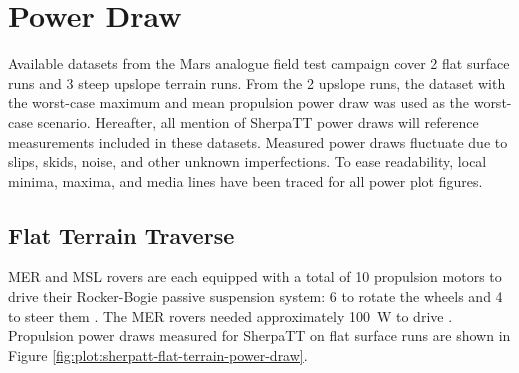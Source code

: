 \section{Power Draw}
\label{sec:PropulsionPowerConstraints:PowerDraw}
Available datasets from the Mars analogue field test campaign cover 2 flat surface runs and 3 steep upslope terrain runs. From the 2 upslope runs, the dataset with the worst-case maximum and mean propulsion power draw was used as the worst-case scenario. Hereafter, all mention of SherpaTT power draws will reference measurements included in these datasets. Measured power draws fluctuate due to slips, skids, noise, and other unknown imperfections. To ease readability, local minima, maxima, and media lines have been traced for all power plot figures.


\subsection{Flat Terrain Traverse}
\label{sec:PropulsionPowerConstraints:FlatTerrainTraverse}
\ac{MER} and \ac{MSL} rovers are each equipped with a total of 10 propulsion motors to drive their Rocker-Bogie passive suspension system: 6 to rotate the wheels and 4 to steer them  . The \ac{MER} rovers needed approximately \SI{100}{\watt} to drive . Propulsion power draws measured for SherpaTT on flat surface runs are shown in Figure \ref{fig:plot:sherpatt-flat-terrain-power-draw}.

